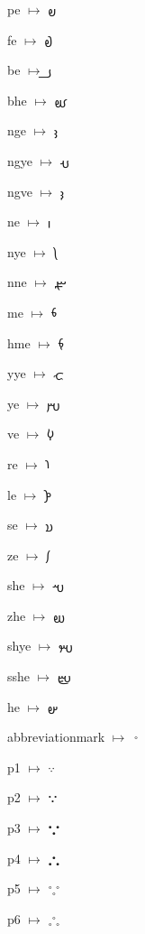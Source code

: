 {\noindent pe $\mapsto$ {\avfont 𐬞}\par
\noindent fe $\mapsto$ {\avfont 𐬟}\par
\noindent be $\mapsto$ {\avfont 𐬠}\par
\noindent bhe $\mapsto$ {\avfont 𐬡}\par
\noindent nge $\mapsto$ {\avfont 𐬢}\par
\noindent ngye $\mapsto$ {\avfont 𐬣}\par
\noindent ngve $\mapsto$ {\avfont 𐬤}\par
\noindent ne $\mapsto$ {\avfont 𐬥}\par
\noindent nye $\mapsto$ {\avfont 𐬦}\par
\noindent nne $\mapsto$ {\avfont 𐬧}\par
\noindent me $\mapsto$ {\avfont 𐬨}\par
\noindent hme $\mapsto$ {\avfont 𐬩}\par
\noindent yye $\mapsto$ {\avfont 𐬪}\par
\noindent ye $\mapsto$ {\avfont 𐬫}\par
\noindent ve $\mapsto$ {\avfont 𐬬}\par
\noindent re $\mapsto$ {\avfont 𐬭}\par
\noindent le $\mapsto$ {\avfont 𐬮}\par
\noindent se $\mapsto$ {\avfont 𐬯}\par
\noindent ze $\mapsto$ {\avfont 𐬰}\par
\noindent she $\mapsto$ {\avfont 𐬱}\par
\noindent zhe $\mapsto$ {\avfont 𐬲}\par
\noindent shye $\mapsto$ {\avfont 𐬳}\par
\noindent sshe $\mapsto$ {\avfont 𐬴}\par
\noindent he $\mapsto$ {\avfont 𐬵}\par
\noindent abbreviationmark $\mapsto$ {\avfont 𐬹}\par
\noindent p1 $\mapsto$ {\avfont 𐬺}\par
\noindent p2 $\mapsto$ {\avfont 𐬻}\par
\noindent p3 $\mapsto$ {\avfont 𐬼}\par
\noindent p4 $\mapsto$ {\avfont 𐬽}\par
\noindent p5 $\mapsto$ {\avfont 𐬾}\par
\noindent p6 $\mapsto$ {\avfont 𐬿}\par
}


